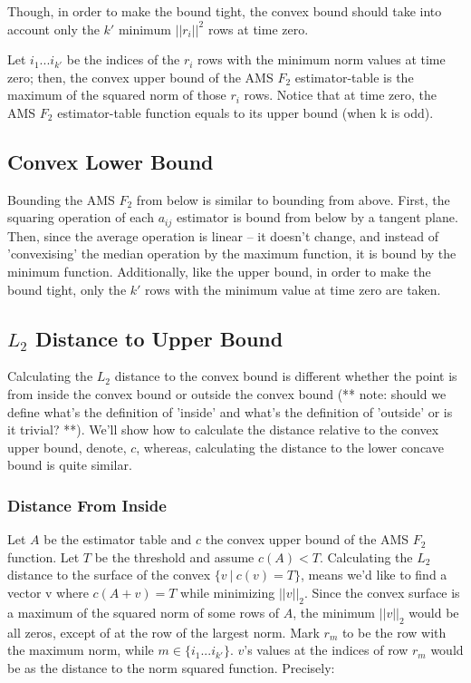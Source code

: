 \documentclass[11pt, conference]{IEEEtran}
\begin{document}
Though, in order to make the bound tight, the convex bound should take into account only the $k'$ minimum $||r_i||^2$ rows at time zero.

Let $i_1 ... i_{k'}$ be the indices of the $r_i$ rows with the minimum norm values at time zero; then, the convex upper bound of the AMS $F_2$ estimator-table is the maximum of the squared norm of those $r_i$ rows. Notice that at time zero, the AMS $F_2$ estimator-table function equals to its upper bound (when k is odd).

	\subsection{Convex Lower Bound}

Bounding the AMS $F_2$ from below is similar to bounding from above. First, the squaring operation of each $a_{ij}$ estimator is bound from below by a tangent plane. Then, since the average operation is linear -- it doesn't change, and instead of 'convexising' the median operation by the maximum function, it is bound by the minimum function. Additionally, like the upper bound, in order to make the bound tight, only the $k'$ rows with the minimum value at time zero are taken.

	\subsection{$L_2$ Distance to Upper Bound}

Calculating the $L_2$ distance to the convex bound is different whether the point is from inside the convex bound or outside the convex bound (** note: should we define what's the definition of 'inside' and what's the definition of 'outside' or is it trivial? **). We'll show how to calculate the distance relative to the convex upper bound, denote, $c$, whereas, calculating the distance to the lower concave bound is quite similar.

		\subsubsection{Distance From Inside}
	
Let $A$ be the estimator table and $c$ the convex upper bound of the AMS $F_2$ function. Let $T$ be the threshold and assume ${c(A) < T}$. Calculating the $L_2$ distance to the surface of the convex ${\{v \ |\ c(v) = T\}}$, means we'd like to find a vector v where ${c(A+v)=T}$ while minimizing $||v||_2$. Since the convex surface is a maximum of the squared norm of some rows of $A$, the minimum $||v||_2$ would be all zeros, except of at the row of the largest norm. Mark $r_m$ to be the row with the maximum norm, while ${m \in \{i_1 ... i_{k'}\}}$. $v$'s values at the indices of row $r_m$ would be as the distance to the norm squared function. Precisely:
\end{document}
